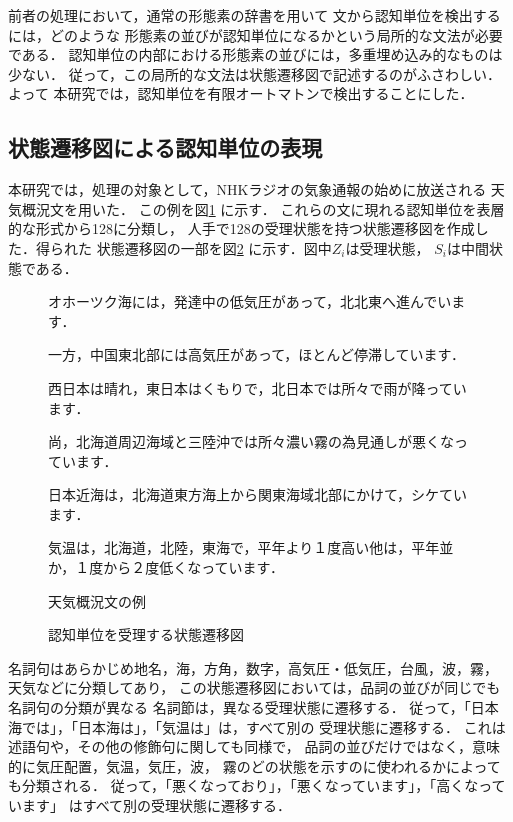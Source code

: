 前者の処理において，通常の形態素の辞書を用いて
文から認知単位を検出するには，どのような
形態素の並びが認知単位になるかという局所的な文法が必要である．
認知単位の内部における形態素の並びには，多重埋め込み的なものは少ない．
従って，この局所的な文法は状態遷移図で記述するのがふさわしい．よって
本研究では，認知単位を有限オートマトンで検出することにした．

\vspace*{-4mm}
\subsection{状態遷移図による認知単位の表現}
本研究では，処理の対象として，NHKラジオの気象通報の始めに放送される
天気概況文を用いた．
この例を図\ref{zu2} に示す．
これらの文に現れる認知単位を表層的な形式から128に分類し，
人手で128の受理状態を持つ状態遷移図を作成した．得られた
状態遷移図の一部を図\ref{zu3} に示す．図中$Z_i$は受理状態，
$S_i$は中間状態である．



\begin{figure}[b]
\small
オホーツク海には，発達中の低気圧があって，北北東へ進んでいます．

一方，中国東北部には高気圧があって，ほとんど停滞しています．

西日本は晴れ，東日本はくもりで，北日本では所々で雨が降っています．

尚，北海道周辺海域と三陸沖では所々濃い霧の為見通しが悪くなっています．

日本近海は，北海道東方海上から関東海域北部にかけて，シケています．

気温は，北海道，北陸，東海で，平年より１度高い他は，平年並か，１度から２度低くなっています．
\caption{天気概況文の例} \label{zu2}
\end{figure}

\begin{figure}[b]
\begin{center}
\end{center}
\caption{認知単位を受理する状態遷移図} \label{zu3}
\end{figure}
名詞句はあらかじめ地名，海，方角，数字，高気圧・低気圧，台風，波，霧，
天気などに分類してあり，
この状態遷移図においては，品詞の並びが同じでも名詞句の分類が異なる
名詞節は，異なる受理状態に遷移する．
従って，「日本海では」，「日本海は」，「気温は」は，すべて別の
受理状態に遷移する．
これは述語句や，その他の修飾句に関しても同様で，
品詞の並びだけではなく，意味的に気圧配置，気温，気圧，波，
霧のどの状態を示すのに使われるかによっても分類される．
従って，「悪くなっており」，「悪くなっています」，「高くなっています」
はすべて別の受理状態に遷移する．

